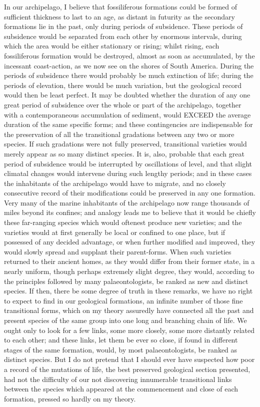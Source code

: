 In our archipelago, I believe that fossiliferous formations could be formed of sufficient thickness to last to an age, as distant in futurity as the secondary formations lie in the past, only during periods of subsidence. These periods of subsidence would be separated from each other by enormous intervals, during which the area would be either stationary or rising; whilst rising, each fossiliferous formation would be destroyed, almost as soon as accumulated, by the incessant coast-action, as we now see on the shores of South America. During the periods of subsidence there would probably be much extinction of life; during the periods of elevation, there would be much variation, but the geological record would then be least perfect.
It may be doubted whether the duration of any one great period of subsidence over the whole or part of the archipelago, together with a contemporaneous accumulation of sediment, would EXCEED the average duration of the same specific forms; and these contingencies are indispensable for the preservation of all the transitional gradations between any two or more species. If such gradations were not fully preserved, transitional varieties would merely appear as so many distinct species. It is, also, probable that each great period of subsidence would be interrupted by oscillations of level, and that slight climatal changes would intervene during such lengthy periods; and in these cases the inhabitants of the archipelago would have to migrate, and no closely consecutive record of their modifications could be preserved in any one formation.
Very many of the marine inhabitants of the archipelago now range thousands of miles beyond its confines; and analogy leads me to believe that it would be chiefly these far-ranging species which would oftenest produce new varieties; and the varieties would at first generally be local or confined to one place, but if possessed of any decided advantage, or when further modified and improved, they would slowly spread and supplant their parent-forms. When such varieties returned to their ancient homes, as they would differ from their former state, in a nearly uniform, though perhaps extremely slight degree, they would, according to the principles followed by many palaeontologists, be ranked as new and distinct species.
If then, there be some degree of truth in these remarks, we have no right to expect to find in our geological formations, an infinite number of those fine transitional forms, which on my theory assuredly have connected all the past and present species of the same group into one long and branching chain of life. We ought only to look for a few links, some more closely, some more distantly related to each other; and these links, let them be ever so close, if found in different stages of the same formation, would, by most palaeontologists, be ranked as distinct species. But I do not pretend that I should ever have suspected how poor a record of the mutations of life, the best preserved geological section presented, had not the difficulty of our not discovering innumerable transitional links between the species which appeared at the commencement and close of each formation, pressed so hardly on my theory.

